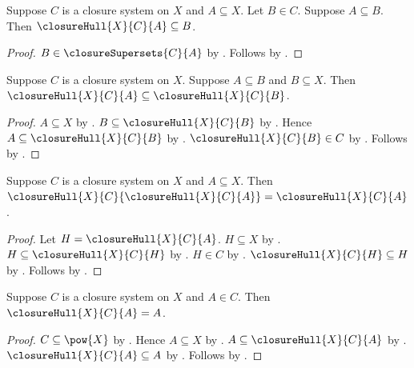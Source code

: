 \begin{proposition}\label{closure_hull_least}
    Suppose $C$ is a closure system on $X$ and $A\subseteq X$.
    Let $B\in C$.
    Suppose $A\subseteq B$.
    Then $\closureHull{X}{C}{A}\subseteq B$.
\end{proposition}
\begin{proof}
    $B\in\closureSupersets{C}{A}$ by
        .
    Follows by
        .
\end{proof}

\begin{proposition}\label{closure_hull_monotone}
    Suppose $C$ is a closure system on $X$.
    Suppose $A\subseteq B$ and $B\subseteq X$.
    Then $\closureHull{X}{C}{A}\subseteq\closureHull{X}{C}{B}$.
\end{proposition}
\begin{proof}
    $A\subseteq X$ by .
    $B\subseteq\closureHull{X}{C}{B}$ by
        .
    Hence $A\subseteq\closureHull{X}{C}{B}$ by
        .
    $\closureHull{X}{C}{B}\in C$ by
        .
    Follows by .
\end{proof}

\begin{proposition}\label{closure_hull_idempotent}
    Suppose $C$ is a closure system on $X$ and $A\subseteq X$.
    Then
        $\closureHull{X}{C}{\closureHull{X}{C}{A}}
            =\closureHull{X}{C}{A}$.
\end{proposition}
\begin{proof}
    Let $H=\closureHull{X}{C}{A}$.
    $H\subseteq X$ by .
    $H\subseteq\closureHull{X}{C}{H}$ by
        .
    $H\in C$ by .
    $\closureHull{X}{C}{H}\subseteq H$ by
        .
    Follows by .
\end{proof}

\begin{proposition}\label{closure_hull_already_closed}
    Suppose $C$ is a closure system on $X$ and $A\in C$.
    Then $\closureHull{X}{C}{A}=A$.
\end{proposition}
\begin{proof}
    $C\subseteq\pow{X}$ by .
    Hence $A\subseteq X$ by .
    $A\subseteq\closureHull{X}{C}{A}$ by
        .
    $\closureHull{X}{C}{A}\subseteq A$ by
        .
    Follows by .
\end{proof}

